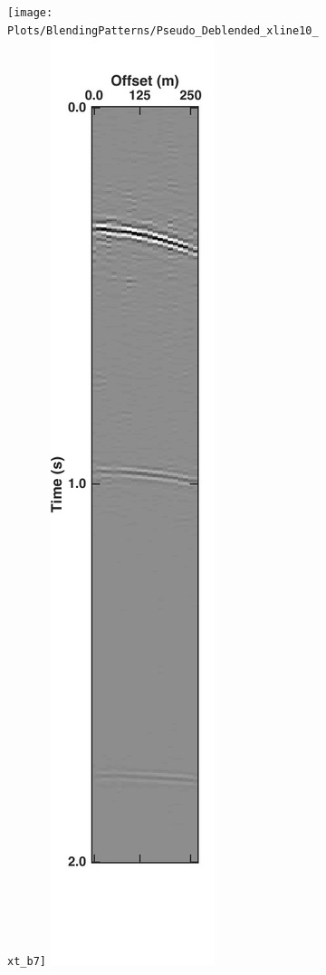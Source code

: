 \begin{figure}
\begin{subfigure}[t]{0.26\textwidth}
		\caption{}
		\label{fig:Ch-Results-Debl-inline10-t}
	\end{subfigure}
	\centering
	\begin{subfigure}[t]{0.26\textwidth}
		\centering
		\texttt{[image: Plots/BlendingPatterns/Pseudo\_Deblended\_xline10\_xt\_b7]}
		\includegraphics[height = 0.38\textheight]{Plots/BlendingPatterns/Deblended_xline10xt}
		\caption{}
		\label{fig:Ch-Results-Debl-inline10-xt}
	\end{subfigure}
	

\end{figure}
